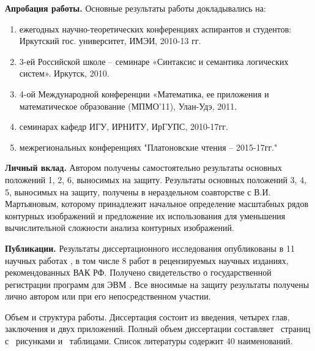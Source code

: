 \textbf{Апробация работы.} Основные результаты работы докладывались на: 

\begin{enumerate}
\item ежегодных научно-теоретических конференциях аспирантов и студентов:  Иркутский  гос. университет, ИМЭИ, 2010-13 гг.
\item 3-ей Российской школе – семинаре «Синтаксис и семантика логических систем». Иркутск, 2010.
\item 4-ой Международной конференции «Математика, ее приложения и математическое образование (МПМО’11),  Улан-Удэ, 2011.
\item семинарах кафедр ИГУ, ИРНИТУ, ИрГУПС, 2010-17гг.
\item межрегиональных конференциях "Платоновские чтения – 2015-17гг."
\end{enumerate}


\textbf{Личный вклад.} Автором получены самостоятельно результаты основных положений 1, 2, 6,  выносимых  на защиту.  Результаты основных положений 3, 4, 5,  выносимых  на защиту, получены в нераздельном соавторстве с В.И. Мартьяновым, которому принадлежит начальное определение масштабных рядов контурных изображений и предложение их использования для уменьшения вычислительной сложности анализа контурных изображений.


\textbf{Публикации.} Результаты диссертационного исследования
опубликованы в 11 научных работах \cite{D5,D6,D7,D8,D15,D16,D19,D20,scaleline,overlaps,emulsion}, в том числе 8 \cite{D6,D7,D8,D15,D19,D20,scaleline,overlaps,emulsion} работ в рецензируемых научных изданиях, рекомендованных ВАК РФ. Получено свидетельство о государственной регистрации программ для ЭВМ \cite{D18}.
Все вносимые на защиту результаты получены лично автором или при его непосредственном участии.


Объем и структура работы. Диссертация состоит из введения, четырех глав, заключения и двух приложений. Полный объем диссертации составляет \pageref{LastPage}\ страниц с \totalfigures\ рисунками и \totaltables\ таблицами. Список литературы содержит 40 наименований.